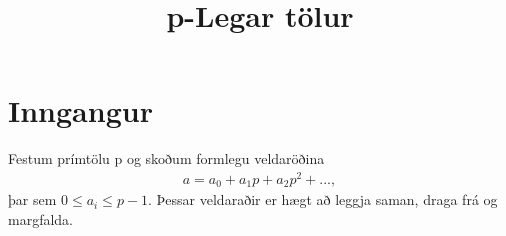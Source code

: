 
\title{p-Legar tölur}

\maketitle
\section*{Inngangur}

Festum prímtölu p og skoðum formlegu veldaröðina
\begin{align*}
a = a_0 + a_1 p + a_2 p^2 + ...,
\end{align*}
þar sem $0 \leq a_i \leq p-1$. Þessar veldaraðir er hægt að leggja saman, draga frá og margfalda.



